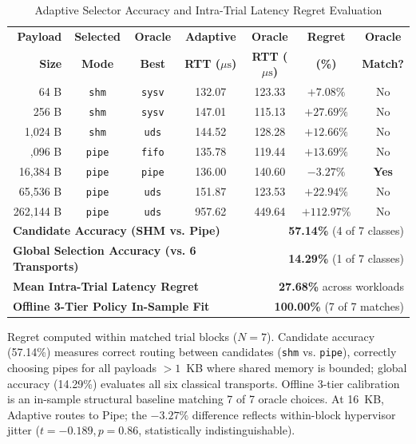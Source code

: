 \begin{table}[!t]
\centering
\caption{Adaptive Selector Accuracy and Intra-Trial Latency Regret Evaluation}
\label{tab:adaptive_results}
\scriptsize
\renewcommand{\arraystretch}{0.88}
\setlength{\tabcolsep}{2.2pt}
\begin{tabular*}{\columnwidth}{@{\extracolsep{\fill}}rcccccc}
\toprule
\textbf{Payload} & \textbf{Selected} & \textbf{Oracle} & \textbf{Adaptive} & \textbf{Oracle} & \textbf{Regret} & \textbf{Oracle} \\
\textbf{Size} & \textbf{Mode} & \textbf{Best} & \textbf{RTT ($\mu\text{s}$)} & \textbf{RTT ($\mu\text{s}$)} & \textbf{(\%)} & \textbf{Match?} \\
\midrule
64 B & \texttt{shm} & \texttt{sysv} & 132.07 & 123.33 & $+7.08\%$ & No \\
256 B & \texttt{shm} & \texttt{sysv} & 147.01 & 115.13 & $+27.69\%$ & No \\
1,024 B & \texttt{shm} & \texttt{uds} & 144.52 & 128.28 & $+12.66\%$ & No \\
\addlinespace[1.0pt]
4,096 B & \texttt{pipe} & \texttt{fifo} & 135.78 & 119.44 & $+13.69\%$ & No \\
16,384 B & \texttt{pipe} & \texttt{pipe} & 136.00 & 140.60 & $-3.27\%$ & \textbf{Yes} \\
65,536 B & \texttt{pipe} & \texttt{uds} & 151.87 & 123.53 & $+22.94\%$ & No \\
262,144 B & \texttt{pipe} & \texttt{uds} & 957.62 & 449.64 & $+112.97\%$ & No \\
\midrule
\multicolumn{4}{l}{\textbf{Candidate Accuracy (SHM vs. Pipe)}} & \multicolumn{3}{r}{\textbf{57.14\%} (4 of 7 classes)} \\
\multicolumn{4}{l}{\textbf{Global Selection Accuracy (vs. 6 Transports)}} & \multicolumn{3}{r}{\textbf{14.29\%} (1 of 7 classes)} \\
\multicolumn{4}{l}{\textbf{Mean Intra-Trial Latency Regret}} & \multicolumn{3}{r}{\textbf{27.68\%} across workloads} \\
\multicolumn{4}{l}{\textbf{Offline 3-Tier Policy In-Sample Fit}} & \multicolumn{3}{r}{\textbf{100.00\%} (7 of 7 matches)} \\
\bottomrule
\end{tabular*}
\vskip 1.5pt
{\scriptsize\noindent Regret computed within matched trial blocks ($N=7$). Candidate accuracy (57.14\%) measures correct routing between candidates (\texttt{shm} vs. \texttt{pipe}), correctly choosing pipes for all payloads $>1$~KB where shared memory is bounded; global accuracy (14.29\%) evaluates all six classical transports. Offline 3-tier calibration is an in-sample structural baseline matching 7 of 7 oracle choices. At 16~KB, Adaptive routes to Pipe; the $-3.27\%$ difference reflects within-block hypervisor jitter ($t = -0.189, p=0.86$, statistically indistinguishable).\par}
\end{table}
